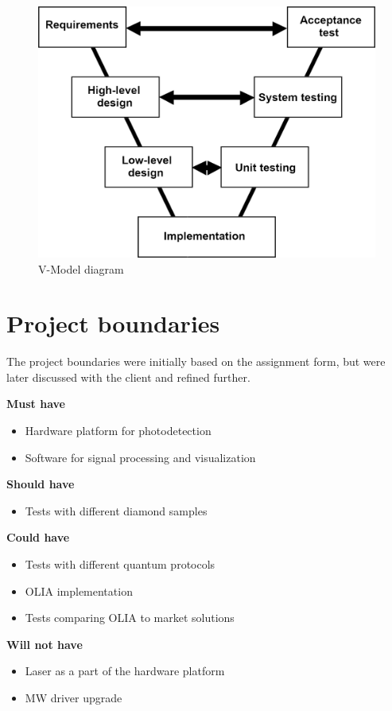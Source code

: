 \documentclass{report}
\begin{document}
	\begin{figure}[ht]
		\centering
		\includegraphics[width=0.7\linewidth]{img/vmodel}
		\caption{V-Model diagram}
		\label{fig:vmodel}
	\end{figure}

	\chapter{Project boundaries} \label{project_boundaries}
	The project boundaries were initially based on the assignment form, but were later discussed with the client and refined further. 
	
	\textbf{Must have}
	\begin{itemize}
		\item Hardware platform for photodetection
		\item Software for signal processing and visualization
	\end{itemize}
	
	\textbf{Should have}
	\begin{itemize}
		\item Tests with different diamond samples
	\end{itemize}
	
	\textbf{Could have}
	\begin{itemize}
		\item Tests with different quantum protocols
		\item OLIA implementation
		\item Tests comparing OLIA to market solutions
	\end{itemize}
	
	\textbf{Will not have}
	\begin{itemize}
		\item Laser as a part of the hardware platform
		\item MW driver upgrade
	\end{itemize}
	
\end{document}
